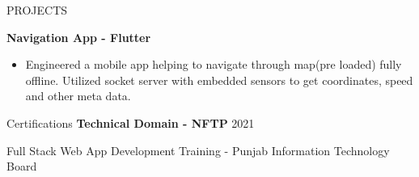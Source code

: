 \documentclass{resume} %
\begin{document}
\begin{rSection}{PROJECTS}
\item \textbf{Navigation App - Flutter} 
 \begin{itemize}
\item {Engineered  a mobile app helping to navigate through map(pre loaded) fully offline. Utilized socket server with embedded sensors to get coordinates, speed and other meta data.}
 \end{itemize}

\end{rSection} 

\begin{rSection}{Certifications} 
	\textbf{Technical Domain - NFTP} \hfill 2021 
    \item {Full Stack Web App Development Training - Punjab Information Technology
    Board}



\end{rSection}

\end{document}
